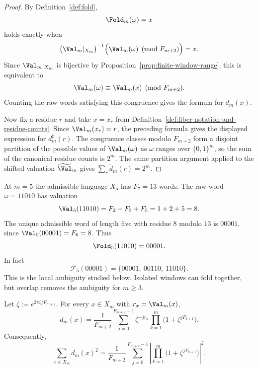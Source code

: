 \begin{proof}
By Definition~\ref{def:fold},
\[
\Fold_m(\omega)=x
\]
holds exactly when
\[
\bigl(\Val_m|_{X_m}\bigr)^{-1}
\Bigl(\Val_m(\omega)\pmod {F_{m+2}}\Bigr)=x.
\]
Since $\Val_m|_{X_m}$ is bijective by
Proposition~\ref{prop:finite-window-range}, this is equivalent to
\[
\Val_m(\omega)\equiv\Val_m(x)\pmod {F_{m+2}}.
\]
Counting the raw words satisfying this congruence gives the formula for
$d_m(x)$.

Now fix a residue $r$ and take $x=x_r$ from
Definition~\ref{def:fiber-notation-and-residue-counts}.  Since
$\Val_m(x_r)=r$, the preceding formula gives the displayed expression for
$d_m^\sharp(r)$.  The congruence classes modulo $F_{m+2}$ form a disjoint
partition of the possible values of $\Val_m(\omega)$ as
$\omega$ ranges over $\{0,1\}^m$, so the sum of the canonical residue counts is
$2^m$.  The same partition argument applied to the shifted valuation
$\widetilde{\Val}_m$ gives
$\sum_r\widetilde d_m(r)=2^m$.
\end{proof}

\begin{remark}[Example at $m=5$]
At $m=5$ the admissible language $X_5$ has $F_7=13$ words. The raw word $\omega=11010$ has valuation
\[
\Val_5(11010)=F_2+F_3+F_5=1+2+5=8.
\]
The unique admissible word of length five with residue $8$ modulo $13$ is $00001$, since $\Val_5(00001)=F_6=8$. Thus
\[
\Fold_5(11010)=00001.
\]
In fact
\[
\mathcal F_5(00001)=\{00001,\ 00110,\ 11010\}.
\]
This is the local ambiguity studied below. Isolated windows can fold together, but overlap removes the ambiguity for $m\ge3$.
\end{remark}

\begin{theorem}\label{thm:fiber-dft}
Let $\zeta:=e^{2\pi i/F_{m+2}}$.  For every $x\in X_m$ with
$r_x=\Val_m(x)$,
\begin{equation}\label{eq:fiber-dft}
d_m(x)
=
\frac{1}{F_{m+2}}
\sum_{j=0}^{F_{m+2}-1}
\zeta^{-jr_x}
\prod_{k=1}^m\bigl(1+\zeta^{jF_{k+1}}\bigr).
\end{equation}
Consequently,
\begin{equation}\label{eq:fiber-second-moment}
\sum_{x\in X_m}d_m(x)^2
=
\frac{1}{F_{m+2}}
\sum_{j=0}^{F_{m+2}-1}
\left|
\prod_{k=1}^m\bigl(1+\zeta^{jF_{k+1}}\bigr)
\right|^2 .
\end{equation}
\end{theorem}


